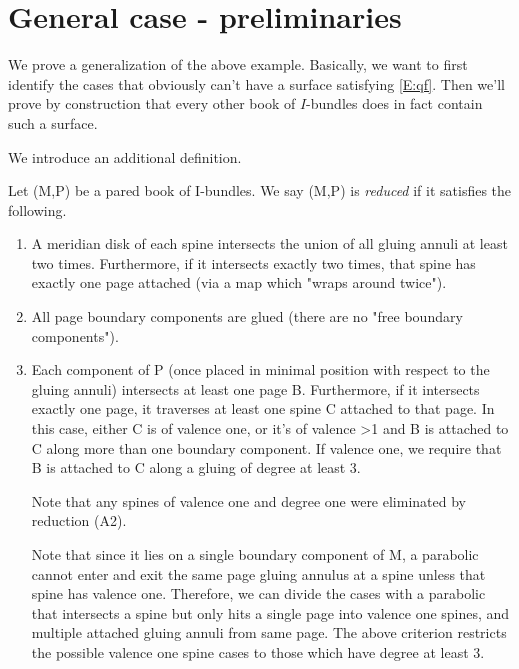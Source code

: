 \section{General case - preliminaries}

We prove a generalization of the above example. Basically, we want to first
identify the cases that obviously can't have a surface satisfying \eqref{E:qf}.
Then we'll prove by construction that every other book of $I$-bundles does in
fact contain such a surface.

We introduce an additional definition.

\begin{defn}

Let (M,P) be a pared book of I-bundles. We say (M,P) is \emph{reduced} if it
satisfies the following.

\begin{enumerate}

\item A meridian disk of each spine intersects the union of all gluing annuli
at least two times. Furthermore, if it intersects exactly two times, that spine
has exactly one page attached (via a map which "wraps around twice").

\item All page boundary components are glued (there are no "free boundary
components").

\item Each component of P (once placed in minimal position with respect to the
gluing annuli) intersects at least one page B. Furthermore, if it intersects
exactly one page, it traverses at least one spine C attached to that page. In
this case, either C is of valence one, or it's of valence >1 and B is attached
to C along more than one boundary component. If valence one, we require that
B is attached to C along a gluing of degree at least 3.

Note that any spines of valence one and degree one were eliminated by reduction
(A2).

Note that since it lies on a single boundary component of M, a parabolic cannot
enter and exit the same page gluing annulus at a spine unless that spine has
valence one. Therefore, we can divide the cases with a parabolic that
intersects a spine but only hits a single page into valence one spines, and
multiple attached gluing annuli from same page. The above criterion restricts
the possible valence one spine cases to those which have degree at least 3.

\end{enumerate}

\end{defn}

